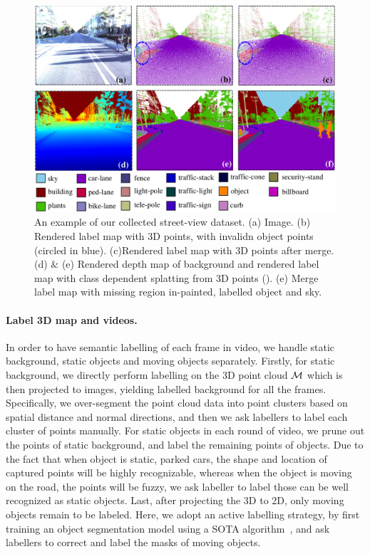 \begin{figure}[!htpb]
\begin{center}
\includegraphics[width=\linewidth]{fig/dataset.pdf}
\end{center}
   \caption{An example of our collected street-view dataset. (a) Image. (b) Rendered label map with 3D points, with invalidn object points (circled in blue). (c)Rendered label map with 3D points after merge. (d) $\&$ (e) Rendered depth map of background and rendered label map with class dependent splatting from 3D points (). (e) Merge label map with missing region in-painted, labelled object and sky.}
\label{fig:data}
\end{figure}

\paragraph{Label 3D map and videos.}
In order to have semantic labelling of each frame in video, we handle static background, static objects and moving objects separately.
Firstly, for static background, we directly perform labelling on the 3D point cloud ${\mathcal M}$ which is then projected to images, yielding labelled background for all the frames.
Specifically, we over-segment the point cloud data into point clusters based on spatial distance and normal directions, and then we ask labellers to label each cluster of points manually.
For static objects in each round of video, we prune out the points of static background, and label the remaining points of objects. Due to the fact that when object is static, \eg parked cars, the shape and location of captured points will be highly recognizable, whereas when the object is moving on the road, the points will be fuzzy, we ask labeller to label those can be well recognized as static objects. Last, after projecting the 3D to 2D, only moving objects remain to be labeled. Here, we adopt an active labelling strategy, by first training an object segmentation model using a SOTA algorithm~\cite{WuSH16e}, and ask labellers to correct and label the masks of moving objects.

